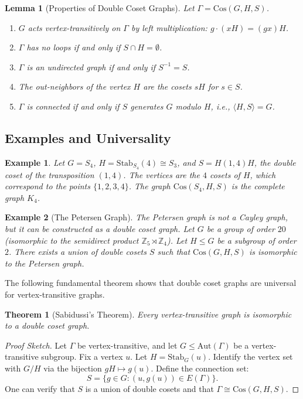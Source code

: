 \documentclass[12pt,a4paper,openany]{book}
\newtheorem{theorem}{Theorem}[section]
\newtheorem{example}{Example}[section]
\newtheorem{lemma}{Lemma}[section]
\begin{document}
\begin{lemma}[Properties of Double Coset Graphs]
Let $\Gamma = \mathrm{Cos}(G, H, S)$.
\begin{enumerate}
    \item $G$ acts vertex-transitively on $\Gamma$ by left multiplication: $g \cdot (xH) = (gx)H$.
    \item $\Gamma$ has no loops if and only if $S \cap H = \emptyset$.
    \item $\Gamma$ is an undirected graph if and only if $S^{-1} = S$.
    \item The out-neighbors of the vertex $H$ are the cosets $sH$ for $s \in S$.
    \item $\Gamma$ is connected if and only if $S$ generates $G$ modulo $H$, i.e., $\langle H, S \rangle = G$.
\end{enumerate}
\end{lemma}

\subsection{Examples and Universality}

\begin{example}
Let $G = S_4$, $H = \mathrm{Stab}_{S_4}(4) \cong S_3$, and $S = H(1,4)H$, the double coset of the transposition $(1,4)$. The vertices are the $4$ cosets of $H$, which correspond to the points $\{1,2,3,4\}$. The graph $\mathrm{Cos}(S_4, H, S)$ is the complete graph $K_4$.
\end{example}

\begin{example}[The Petersen Graph]
The Petersen graph is not a Cayley graph, but it can be constructed as a double coset graph. Let $G$ be a group of order $20$ (isomorphic to the semidirect product $\mathbb{Z}_5 \rtimes \mathbb{Z}_4$). Let $H \le G$ be a subgroup of order $2$. There exists a union of double cosets $S$ such that $\mathrm{Cos}(G, H, S)$ is isomorphic to the Petersen graph.
\end{example}

The following fundamental theorem shows that double coset graphs are universal for vertex-transitive graphs.

\begin{theorem}[Sabidussi's Theorem]\label{thm:sabidussi-double-coset}
Every vertex-transitive graph is isomorphic to a double coset graph.
\end{theorem}
\begin{proof}[Proof Sketch]
Let $\Gamma$ be vertex-transitive, and let $G \le \mathrm{Aut}(\Gamma)$ be a vertex-transitive subgroup. Fix a vertex $u$. Let $H = \mathrm{Stab}_G(u)$. Identify the vertex set with $G/H$ via the bijection $gH \mapsto g(u)$. Define the connection set:
\[
S = \{ g \in G : (u, g(u)) \in E(\Gamma) \}.
\]
One can verify that $S$ is a union of double cosets and that $\Gamma \cong \mathrm{Cos}(G, H, S)$.
\end{proof}
\end{document}
